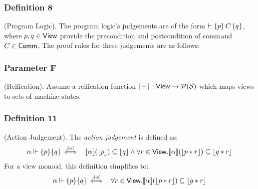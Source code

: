\subsubsection{Definition 8} (Program Logic).
The program logic’s judgements
are of the form
$\vdash \{p\}\, {C}\, \{q\}$,
where $p, q \in \mathsf{View}$ provide the
precondition and postcondition of command $C \in \mathsf{Comm}$. The
proof rules for these judgements are as follows:

\subsubsection{Parameter F} (Reification).
Assume a reification function
$\lfloor{-}\rfloor : \mathsf{View} \rightarrow \mathcal{P}(\mathcal{S}_{\mathsf{}})$
which maps views to sets of machine states.

\subsubsection{Definition 11} (Action Judgement).
The \emph{action judgement} is defined
as:
\begin{eqnarray*}
   {\alpha} \Vdash \{p\} \{q\}
   &\mathrel{\stackrel{\mathrm{def}}{\,\Leftarrow\!\Rightarrow\,}}&
   [\![{\alpha}]\!](\lfloor{p}\rfloor) \subseteq \lfloor{q}\rfloor
   \land
   \forall r \in \mathsf{View} . [\![{\alpha}]\!](\lfloor{p*r}\rfloor) \subseteq \lfloor{q*r}\rfloor
\end{eqnarray*}
For a view monoid, this definition simplifies to:
\begin{eqnarray*}
   {\alpha} \Vdash \{p\} \{q\}
   &\mathrel{\stackrel{\mathrm{def}}{\,\Leftarrow\!\Rightarrow\,}}&
   \forall r \in \mathsf{View} . [\![{\alpha}]\!](\lfloor{p*r}\rfloor) \subseteq \lfloor{q*r}\rfloor
\end{eqnarray*}


